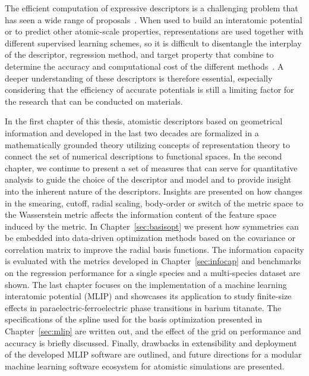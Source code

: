 The efficient computation of expressive descriptors is a challenging problem that has seen a wide range of proposals~\cite{behl11jcp, rupp2012fast, bart+13prb, huo2017unified}.
When used to build an interatomic potential or to predict other atomic-scale properties, representations are used together with different supervised learning schemes, so it is difficult to disentangle the interplay of the descriptor, regression method, and target property that combine to determine the accuracy and computational cost of the different methods~\cite{zuo+20jpcl}.
A deeper understanding of these descriptors is therefore essential, especially considering that the efficiency of accurate potentials is still a limiting factor for the research that can be conducted on materials.

In the first chapter of this thesis, atomistic descriptors based on geometrical information and developed in the last two decades are formalized in a mathematically grounded theory utilizing concepts of representation theory to connect the set of numerical descriptions to functional spaces. %
In the second chapter, we continue to present a set of measures that can serve for quantitative analysis to guide the choice of the descriptor and model and to provide insight into the inherent nature of the descriptors.
Insights are presented on how changes in the smearing, cutoff, radial scaling, body-order or switch of the metric space to the Wasserstein metric affects the information content of the feature space induced by the metric.
In Chapter~\ref{sec:basisopt} we present how symmetries can be embedded into data-driven optimization methods based on the covariance or correlation matrix to improve the radial basis functions.
The information capacity is evaluated with the metrics developed in Chapter~\ref{sec:infocap} and benchmarks on the regression performance for a single species and a multi-species dataset are shown.
The last chapter focuses on the implementation of a machine learning interatomic potential (MLIP) and showcases its application to study finite-size effects in paraelectric-ferroelectric phase transitions in barium titanate.
The specifications of the spline used for the basis optimization presented in Chapter~\ref{sec:mlip} are written out, and the effect of the grid on performance and accuracy is briefly discussed.
Finally, drawbacks in extensibility and deployment of the developed MLIP software are outlined, and future directions for a modular machine learning software ecosystem for atomistic simulations are presented.

